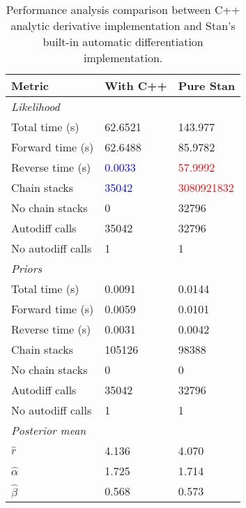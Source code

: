 \documentclass[11pt]{article}
\begin{document}
\begin{table}[H]
    \centering
    \tabcolsep=0.4cm
    \begin{tabular}{lll}
        \toprule
        \textbf{Metric} & \textbf{With C++} & \textbf{Pure Stan} \\
        \midrule
        \multicolumn{3}{l}{\textit{Likelihood}} \\
        Total time (s) & 62.6521 & 143.977 \\
        Forward time (s) & 62.6488 & 85.9782 \\
        Reverse time (s) & \textcolor{blue}{0.0033} & \textcolor{red}{57.9992} \\
        Chain stacks & \textcolor{blue}{35042} & \textcolor{red}{3080921832} \\
        No chain stacks & 0 & 32796 \\
        Autodiff calls & 35042 & 32796 \\
        No autodiff calls & 1 & 1 \\
        \midrule
        \multicolumn{3}{l}{\textit{Priors}} \\
        Total time (s) & 0.0091 & 0.0144 \\
        Forward time (s) & 0.0059 & 0.0101 \\
        Reverse time (s) & 0.0031 & 0.0042 \\
        Chain stacks & 105126 & 98388 \\
        No chain stacks & 0 & 0 \\
        Autodiff calls & 35042 & 32796 \\
        No autodiff calls & 1 & 1 \\
        \midrule
        \multicolumn{3}{l}{\textit{Posterior mean}} \\
        $\hat r$ & 4.136 & 4.070 \\
        $\hat \alpha$ & 1.725 & 1.714 \\
        $\hat \beta$ & 0.568 & 0.573 \\
        \bottomrule
    \end{tabular}
    \caption{Performance analysis comparison between C++ analytic derivative implementation and Stan's built-in automatic differentiation implementation.}
\end{table}










\clearpage


\end{document}
